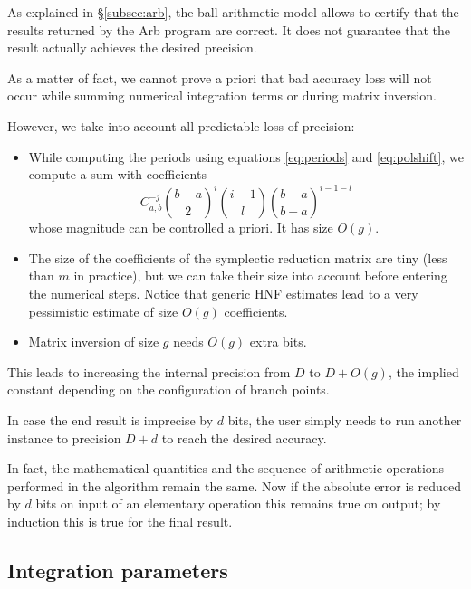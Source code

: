 \documentclass[main.tex]{subfiles}
\begin{document}
   As explained in \S \ref{subsec:arb}, the ball arithmetic model allows
   to certify that the results returned by the Arb program \cite{Johansson2013arb} are correct.
   It does not guarantee that the result actually achieves the desired
   precision.

   As a matter of fact, we cannot prove a priori that bad accuracy loss
   will not occur while summing numerical integration terms or
   during matrix inversion.

   However, we take into account all predictable loss of precision:
   \begin{itemize}
       \item While computing the periods using equations \eqref{eq:periods}
           and \eqref{eq:polshift}, we compute a sum with coefficients
           \begin{equation*}
               C_{a,b}^{-j} \left(\frac{b-a}{2}\right)^i
               {i-1 \choose l} \left(\frac{b+a}{b-a}\right)^{i-1-l}
           \end{equation*}
           whose magnitude can be controlled a priori. It has size $O(g)$.
       \item The size of the coefficients of the symplectic reduction
           matrix are tiny (less than $m$ in practice), but we can take
           their size into account before entering the numerical steps.
           Notice that generic HNF estimates lead to a very pessimistic
           estimate of size $O(g)$ coefficients.
       \item Matrix inversion of size $g$ needs $O(g)$ extra bits.
   \end{itemize}
   This leads to increasing the internal precision from $D$ to $D + O(g)$,
   the implied constant depending on the configuration of branch points.

   \begin{rmk}
   In case the end result is imprecise by $d$ bits, the user simply needs to
   run another instance to precision $D+d$ to reach the desired accuracy.

   In fact, the mathematical quantities and the sequence of arithmetic
   operations performed in the algorithm remain the same. Now
   if the absolute error is reduced by $d$ bits on input of an elementary
   operation this remains true on output; by induction this is true for
   the final result.
   \end{rmk}

   \subsection{Integration parameters}
\end{document}

